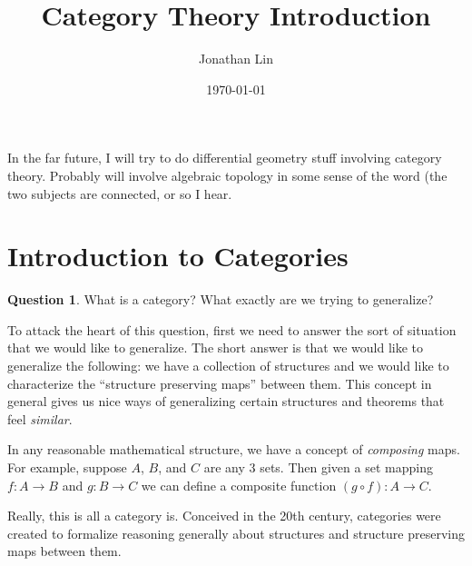 \documentclass[12pt]{article}
\title{Category Theory Introduction}
\author{Jonathan Lin}
\date{\today}
\theoremstyle{plain}
\theoremstyle{definition}
\newtheorem{question}{Question}
\begin{document}
\maketitle

In the far future, I will try to do differential geometry stuff involving category theory. Probably will involve algebraic topology in some sense of the word (the two subjects are connected, or so I hear.

\section{Introduction to Categories}

\begin{question}
What is a category? What exactly are we trying to generalize? 
\end{question}

To attack the heart of this question, first we need to answer the sort of situation that we would like to generalize. The short answer is that we would like to generalize the following: we have a collection of structures and we would like to characterize the ``structure preserving maps'' between them. This concept in general gives us nice ways of generalizing certain structures and theorems that feel \textit{similar}.

In any reasonable mathematical structure, we have a concept of \textit{composing} maps. For example, suppose $A$, $B$, and $C$ are any $3$ sets. Then given a set mapping $f:A \to B$ and $g:B \to C$ we can define a composite function $(g \circ f): A \to C$. 

Really, this is all a category is. Conceived in the 20th century, categories were created to formalize reasoning generally about structures and structure preserving maps between them.
\end{document}
